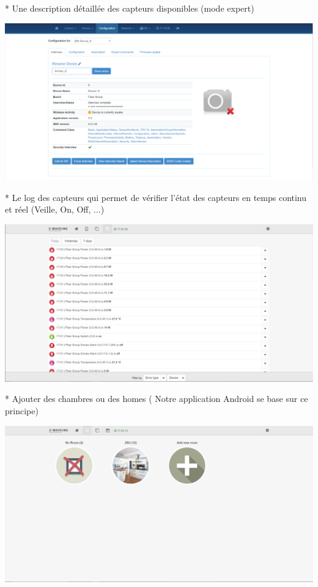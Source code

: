 * Une description détaillée des capteurs disponibles (mode expert)

\includegraphics[scale=0.5]{./latex/Images/png/description_zwaveme.png}\newline

* Le log des capteurs qui permet de vérifier l'état des capteurs en temps continu et réel (Veille, On, Off, ...)


\includegraphics[scale=0.5]{./latex/Images/png/log_zwaveme.png}\newline

* Ajouter des chambres ou des homes ( Notre application Android se base sur ce principe)

\includegraphics[scale=0.5]{./latex/Images/png/room_zwaveme.png}\newline

